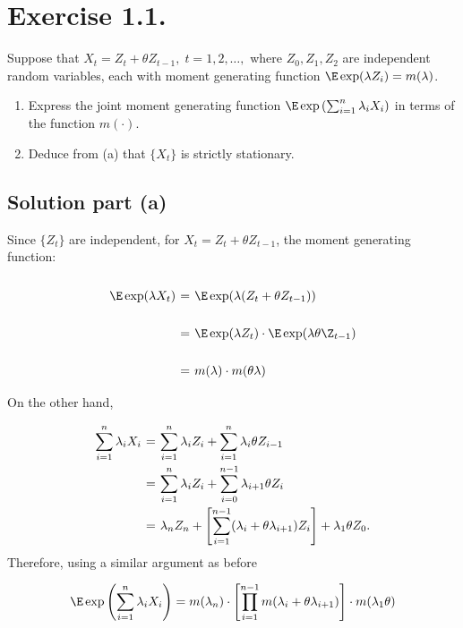 \section*{Exercise 1.1.}

Suppose that $X_t = Z_t + \theta Z_{t-1},\; t = 1,2,\ldots,$ where $Z_0, Z_1, Z_2$ are independent random variables, each with moment generating function $\E \exp(\lambda Z_i) = m(\lambda)$.
\begin{enumerate}[label=(\alph*)]
    \item Express the joint moment generating function $\E\exp\left( \sum_{i = 1}^{n}\lambda_i X_i \right)$ in terms of the function $m(\cdot)$.
    \item Deduce from (a) that $\{X_t\}$ is strictly stationary.
\end{enumerate}

\subsection*{Solution part (a)}

Since $\{Z_t\}$ are independent, for $X_t = Z_t + \theta Z_{t-1}$, the moment generating function:
\[ \everymath{\displaystyle}
\arraycolsep=1.8pt\def\arraystretch{2.5}
\begin{array}{rcl}
    \E \exp(\lambda X_t) & = & \E\exp(\lambda (Z_t + \theta Z_{t-1}))\\
    & = & \E\exp(\lambda Z_t)\cdot \E\exp(\lambda \theta \Z_{t-1}) \\
    & = & m(\lambda)\cdot m(\theta\lambda)
\end{array} \]
On the other hand,
\[ \everymath{\displaystyle}
\arraycolsep=1.8pt\def\arraystretch{2.5}
\begin{array}{rcl}
    \sum_{i = 1}^{n} \lambda_i X_i  & = & \sum_{i = 1}^{n} \lambda_i Z_i + \sum_{i = 1}^{n} \lambda_i \theta Z_{i-1}\\
    & = & \sum_{i = 1}^{n} \lambda_i Z_i + \sum_{i = 0}^{n-1} \lambda_{i+1} \theta Z_{i}\\
    & = & \lambda_n Z_n + \left[ \sum_{i = 1}^{n-1} (\lambda_i + \theta \lambda_{i+1}) Z_i \right] + \lambda_1 \theta Z_0.
\end{array} \]
Therefore, using a similar argument as before
\[ \everymath{\displaystyle}
\arraycolsep=1.8pt\def\arraystretch{2.5}
\begin{array}{rcl}
    \E \exp\left( \sum_{i = 1}^{n} \lambda_i X_i \right) = m(\lambda_n) \cdot \left[ \prod_{i = 1}^{n-1} m(\lambda_i + \theta \lambda_{i+1}) \right] \cdot m(\lambda_1 \theta)
\end{array} \]

